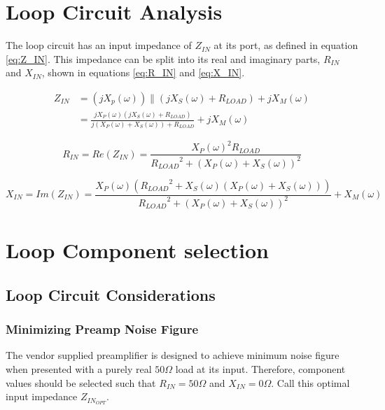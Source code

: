 \section{Loop Circuit Analysis}
The loop circuit has an input impedance of $Z_{IN}$ at its port, as defined in equation \ref{eq:Z_IN}. This impedance can
be split into its real and imaginary parts, $R_{IN}$ and $X_{IN}$, shown in equations \ref{eq:R_IN} and \ref{eq:X_IN}.

\begin{equation} \label{eq:Z_IN}
    \begin{aligned}
        Z_{IN}&=(jX_p(\omega))\parallel(jX_S(\omega)+R_{LOAD})+jX_M(\omega)\\
        &= \frac{j X_P(\omega) (j X_S(\omega) + R_{LOAD})}{j (X_P(\omega) + X_S(\omega)) + R_{LOAD}} + j X_M(\omega)
    \end{aligned}
\end{equation}

\begin{equation} \label{eq:R_IN}
    R_{IN}=Re(Z_{IN})=\frac{{X_P(\omega)}^2 R_{LOAD}}{{R_{LOAD}}^2+(X_P(\omega)+X_S(\omega))^2}
\end{equation}

\begin{equation} \label{eq:X_IN}
    X_{IN}= Im(Z_{IN}) = \frac{X_P(\omega) ({R_{LOAD}}^2 +
    X_S(\omega)(X_P(\omega)+X_S(\omega)))}{{R_{LOAD}}^2+(X_P(\omega)+X_S(\omega))^2}+X_M(\omega)
\end{equation}

\section{Loop Component selection}

\subsection{Loop Circuit Considerations}
\subsubsection{Minimizing Preamp Noise Figure}
The vendor supplied preamplifier is designed to achieve minimum noise figure when presented with a purely real
$50\Omega$ load at its input. Therefore, component values should be selected such that $R_{IN}=50\Omega$ and
$X_{IN}=0\Omega$. Call this optimal input impedance $Z_{IN_{OPT}}$.

